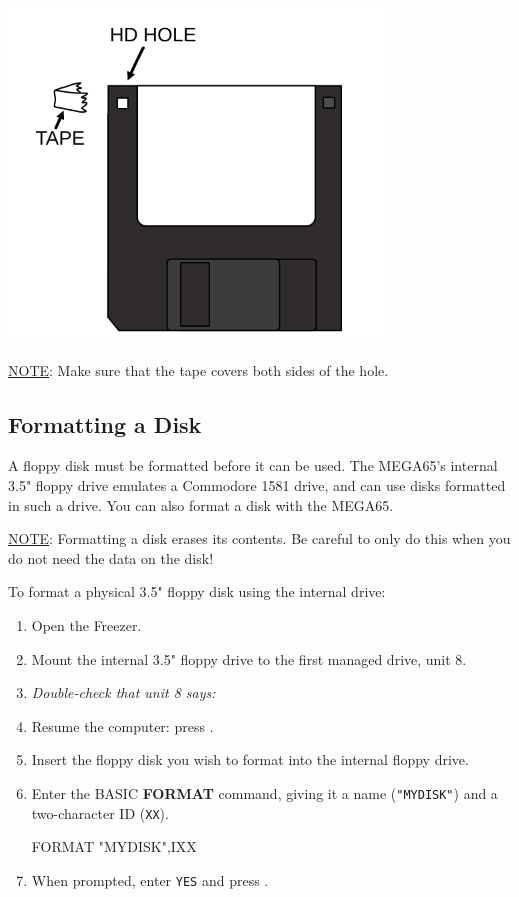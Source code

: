 \begin{center}
  \includegraphics[width=0.75\textwidth]{images/illustrations/floppy_hd.pdf}
\end{center}

\underline{NOTE}: Make sure that the tape covers both sides of the hole.

\subsection{Formatting a Disk}

A floppy disk must be formatted before it can be used. The MEGA65's internal 3.5" floppy drive emulates a Commodore 1581 drive, and can use disks formatted in such a drive. You can also format a disk with the MEGA65.

\underline{NOTE}: Formatting a disk erases its contents. Be careful to only do this when you do not need the data on the disk!

To format a physical 3.5" floppy disk using the internal drive:

\begin{enumerate}
\item Open the Freezer.
\item Mount the internal 3.5" floppy drive to the first managed drive, unit 8.
\item {\it Double-check that unit 8 says:} 
\item Resume the computer: press .
\item Insert the floppy disk you wish to format into the internal floppy drive.
\item Enter the BASIC {\bf FORMAT} command, giving it a name ({\tt "MYDISK"}) and a two-character ID ({\tt XX}).
\begin{screenoutput}
FORMAT "MYDISK",IXX
\end{screenoutput}
\item When prompted, enter {\tt YES} and press .
\end{enumerate}

